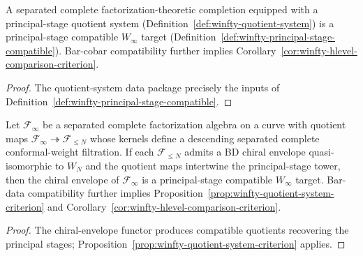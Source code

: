 \begin{proposition}
\label{prop:winfty-quotient-system-criterion}
A separated complete factorization-theoretic completion equipped with a
principal-stage quotient system
(Definition~\ref{def:winfty-quotient-system}) is a principal-stage
compatible $W_\infty$ target
(Definition~\ref{def:winfty-principal-stage-compatible}).
Bar-cobar compatibility further implies
Corollary~\ref{cor:winfty-hlevel-comparison-criterion}.
\end{proposition}

\begin{proof}
The quotient-system data package precisely the inputs of Definition~\ref{def:winfty-principal-stage-compatible}.
\end{proof}

\begin{proposition}
\label{prop:winfty-factorization-envelope-criterion}
Let $\mathcal{F}_\infty$ be a separated complete factorization algebra
on a curve with quotient maps
$\mathcal{F}_\infty \twoheadrightarrow \mathcal{F}_{\le N}$
whose kernels define a descending separated complete conformal-weight
filtration.  If each $\mathcal{F}_{\le N}$ admits a BD chiral envelope
quasi-isomorphic to $W_N$ and the quotient maps intertwine the
principal-stage tower, then the chiral envelope of
$\mathcal{F}_\infty$ is a principal-stage compatible $W_\infty$ target.
Bar-data compatibility further implies
Proposition~\ref{prop:winfty-quotient-system-criterion} and
Corollary~\ref{cor:winfty-hlevel-comparison-criterion}.
\end{proposition}

\begin{proof}
The chiral-envelope functor produces compatible quotients recovering the principal stages; Proposition~\ref{prop:winfty-quotient-system-criterion} applies.
\end{proof}

